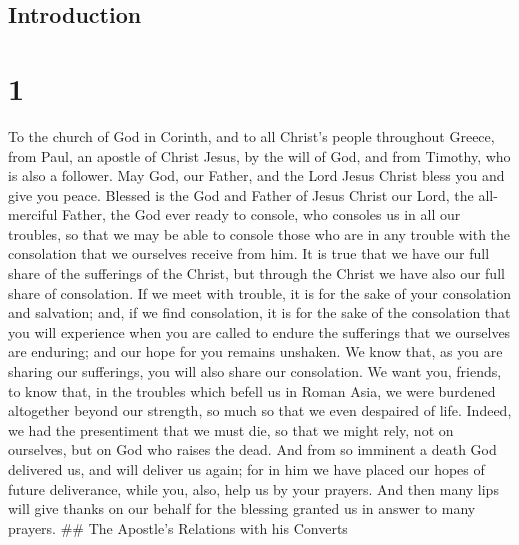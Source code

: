 \hypertarget{introduction}{%
\subsection{Introduction}\label{introduction}}

\hypertarget{section}{%
\section{1}\label{section}}

 To the church of God in Corinth, and to all Christ's people
throughout Greece, from Paul, an apostle of Christ Jesus, by the will of
God, and from Timothy, who is also a follower.  May God, our
Father, and the Lord Jesus Christ bless you and give you peace.
 Blessed is the God and Father of Jesus Christ our Lord, the
all-merciful Father, the God ever ready to console,  who
consoles us in all our troubles, so that we may be able to console those
who are in any trouble with the consolation that we ourselves receive
from him.  It is true that we have our full share of the
sufferings of the Christ, but through the Christ we have also our full
share of consolation.  If we meet with trouble, it is for
the sake of your consolation and salvation; and, if we find consolation,
it is for the sake of the consolation that you will experience when you
are called to endure the sufferings that we ourselves are enduring;
 and our hope for you remains unshaken. We know that, as you
are sharing our sufferings, you will also share our consolation.
 We want you, friends, to know that, in the troubles which
befell us in Roman Asia, we were burdened altogether beyond our
strength, so much so that we even despaired of life. 
Indeed, we had the presentiment that we must die, so that we might rely,
not on ourselves, but on God who raises the dead.  And from
so imminent a death God delivered us, and will deliver us again; for in
him we have placed our hopes of future deliverance, while you, also,
help us by your prayers.  And then many lips will give
thanks on our behalf for the blessing granted us in answer to many
prayers. \#\# The Apostle's Relations with his Converts

